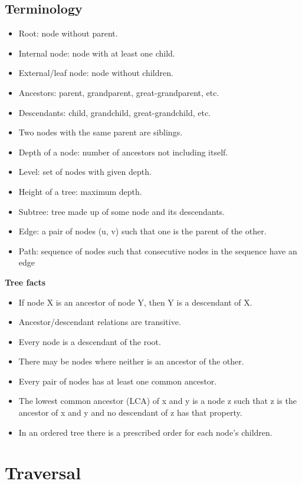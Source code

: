 \documentclass[12pt]{article}
\newcommand{\1}{\space \quad}
\newcommand{\2}{\quad \quad \quad}
\newcommand{\3}{\quad \quad \quad \quad \space}
\newcommand{\4}{\quad \quad \quad \quad \quad \quad}
\begin{document}
\subsection{Terminology}
\begin{itemize}
  \item Root: node without parent.
  \item Internal node: node with at least one child.
  \item External/leaf node: node without children.
  \item Ancestors: parent, grandparent, great-grandparent, etc.
  \item Descendants: child, grandchild, great-grandchild, etc.
  \item Two nodes with the same parent are siblings. 
  \item Depth of a node: number of ancestors not including itself.
  \item Level: set of nodes with given depth.
  \item Height of a tree: maximum depth.
  \item Subtree: tree made up of some node and its descendants. 
  \item Edge: a pair of nodes (u, v) such that one is the parent of the other.
  \item Path: sequence of nodes such that consecutive nodes in the sequence have an edge
\end{itemize}
\textbf{Tree facts}
\begin{itemize}
  \item If node X is an ancestor of node Y, then Y is a descendant of X.
  \item Ancestor/descendant relations are transitive.
  \item Every node is a descendant of the root.
  \item There may be nodes where neither is an ancestor of the other.
  \item Every pair of nodes has at least one common ancestor. 
  \item The lowest common ancestor (LCA) of x and y is a node z such that z is the ancestor of x and y and no descendant of z has that property.
  \item In an ordered tree there is a prescribed order for each node’s children.
\end{itemize}

\section{Traversal}
\end{document}

